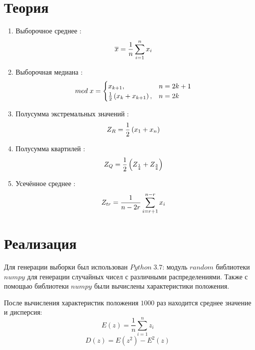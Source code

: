 \documentclass[a4]{article}
\begin{document}
\section{Теория}

\begin{enumerate}
\item Выборочное среднее \cite{average}:
\begin{equation}\label{eqn:average}
\overline{x} = \frac{1}{n}\sum_{i=1}^n x_i \hfill  
\end{equation}
\item Выборочная медиана \cite{med}:
\begin{equation}
med\; x = \begin{cases}
x_{k+1}, & n = 2k+1\\
\frac{1}{2}\left(x_k+x_{k+1}\right), & n = 2k
\end{cases} \hfill  \label{eqn:med}
\end{equation}
\item Полусумма экстремальных значений \cite{mean_extr}:
\begin{equation}
Z_R = \frac{1}{2}\left(x_1+x_n\right) \hfill  \label{eqn:mean_extr}
\end{equation}
\item Полусумма квартилей \cite{quartiles}:
\begin{equation}
Z_Q = \frac{1}{2}\left(Z_{\frac{1}{4}}+Z_{\frac{3}{4}}\right) \hfill  \label{eqn:quartiles}
\end{equation}
\item Усечённое среднее \cite{cut_mean}:
\begin{equation}
Z_{tr} = \frac{1}{n - 2r}\sum_{i=r+1}^{n-r} x_i \hfill  \label{eqn:cut_mean}
\end{equation}
\end{enumerate}

\section{Реализация}
Для генерации выборки был использован $Python\;3.7$: модуль $random$ библиотеки $numpy$ \cite{numpy} для генерации случайных чисел с различными распределениями. Также с помощью библиотеки $numpy$ были вычислены характеристики положения.

После вычисления характеристик положения $1000$ раз находится среднее значение и дисперсия: 
\begin{equation}
E(z) = \frac{1}{n}\sum_{i=1}^n z_i
\end{equation} 
\begin{equation}
D(z) = E\left(z^2\right) - E^2(z)
\end{equation}
\end{document}
